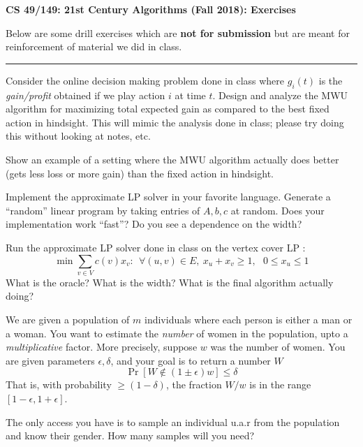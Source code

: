 \documentclass[11pt]{article}
\begin{document}
\newpage
\begin{center}
	{\bf \Large CS 49/149: 21st Century Algorithms (Fall 2018): Exercises}
\end{center}
\vspace{1ex}

Below are some drill exercises which are {\bf not for submission} but are meant for reinforcement of material we did in class.
\vspace{1ex}
\hrule height 1pt
\vspace{1ex}

\begin{drill}
	Consider the online decision making problem done in class where $g_i(t)$ is the {\em gain/profit} obtained if we play action $i$ at time $t$.
	Design and analyze the MWU algorithm for maximizing total expected gain as compared to the best fixed action in hindsight. 
	This will mimic the analysis done in class; please try doing this without looking at notes, etc.
\end{drill}
\vspace{1ex}

\begin{drill}
	Show an example of a setting where the MWU algorithm actually does better (gets less loss or more gain) than the fixed action in hindsight.
\end{drill}
\vspace{1ex}

\begin{drill}
	Implement the approximate LP solver in your favorite language. Generate a ``random'' linear program by taking entries of $A,b,c$ at random.
	Does your implementation work ``fast''? Do you see a dependence on the width?	
\end{drill}
\vspace{1ex}

\begin{drill}
	Run the approximate LP solver done in class on the vertex cover LP : 
	\[
		\min \sum_{v\in V} c(v)x_v: ~~ \forall (u,v)\in E, ~ x_u + x_v \geq 1,~~~  0 \leq x_u \leq 1
	\]
	What is the oracle? What is the width? What is the final algorithm actually doing?
\end{drill}


\vspace{1ex}
\begin{drill}
	
	We are given a population of $m$ individuals where each person is either a man or a woman.
	You want to estimate the {\em number} of women in the population, upto a {\em multiplicative} factor.
	More precisely, suppose $w$ was the number of women. You are given parameters $\epsilon, \delta$, and your goal
	is to return a number $W$
	\[
	\Pr[W \notin (1\pm \epsilon)w] \leq \delta
	\]
	That is, with probability $\ge (1-\delta)$, the fraction $W/w$ is in the range $[1-\epsilon,1+\epsilon]$.
	
	The only access you have is to sample an individual u.a.r from the population and know their gender. How many samples will you need?
	
\end{drill}
\end{document}
